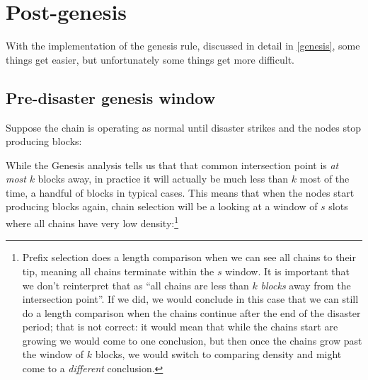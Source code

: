 \pagebreak

\section{Post-genesis}
\label{low-density:post-genesis}

With the implementation of the genesis rule, discussed in detail in
\cref{genesis}, some things get easier, but unfortunately some things get more
difficult.

\subsection{Pre-disaster genesis window}

Suppose the chain is operating as normal until disaster strikes and the nodes
stop producing blocks:
%
\begin{center}
\end{center}
%
While the Genesis analysis \cite{cryptoeprint:2018:378} tells us that that
common intersection point is \emph{at most} $k$ blocks away, in practice it will
actually be much less than $k$ most of the time, a handful of blocks in typical
cases. This means that when the nodes start producing blocks again, chain
selection will be a looking at a window of $s$ slots where all chains have very
low density:\footnote{Prefix selection does a length comparison when we can see
all chains to their tip, meaning all chains terminate within the $s$ window. It
is important that we don't reinterpret that as ``all chains are less than $k$
\emph{blocks} away from the intersection point''. If we did, we would conclude
in this case that we can still do a length comparison when the chains continue
after the end of the disaster period; that is not correct: it would mean that
while the chains start are growing we would come to one conclusion, but then
once the chains grow past the window of $k$ blocks, we would switch to comparing
density and might come to a \emph{different} conclusion.}
%
